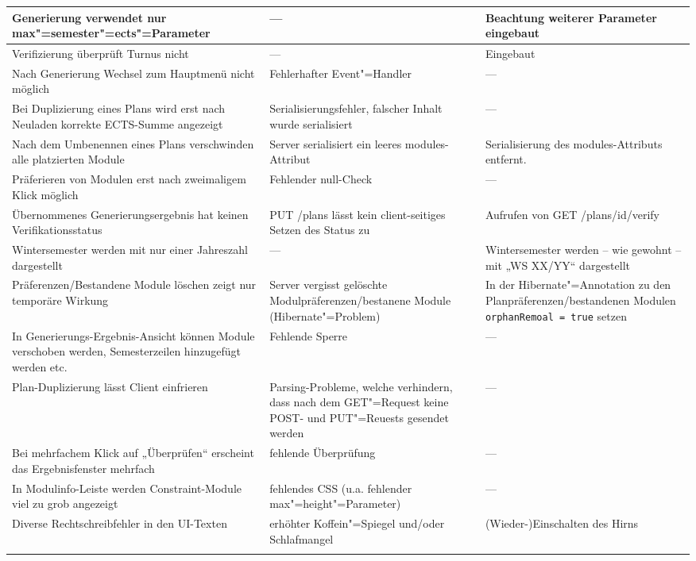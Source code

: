\begin{longtable}{| >{\hspace{0pt}} p{} | >{\hspace{0pt}} p{} | >{\hspace{0pt}} p{} | }
	\hline
	Generierung verwendet nur max"=semester"=ects"=Parameter & --- & Beachtung weiterer Parameter eingebaut \\
	\hline
	Verifizierung überprüft Turnus nicht & --- & Eingebaut \\
	\hline
	Nach Generierung Wechsel zum Hauptmenü nicht möglich & Fehlerhafter Event"=Handler & --- \\
	\hline
	Bei Duplizierung eines Plans wird erst nach Neuladen korrekte ECTS-Summe angezeigt & Serialisierungsfehler, falscher Inhalt wurde serialisiert & --- \\
	\hline
	Nach dem Umbenennen eines Plans verschwinden alle platzierten Module & Server serialisiert ein leeres modules-Attribut & Serialisierung des modules-Attributs entfernt. \\
	\hline
	Präferieren von Modulen erst nach zweimaligem Klick möglich & Fehlender null-Check & --- \\
	\hline
	Übernommenes Generierungsergebnis hat keinen Verifikationsstatus & PUT /plans lässt kein client-seitiges Setzen des Status zu & Aufrufen von GET /plans/id/verify \\
	\hline
	Wintersemester werden mit nur einer Jahreszahl dargestellt & --- & Wintersemester werden – wie gewohnt – mit „WS XX/YY“ dargestellt \\
	\hline
	Präferenzen/Bestandene Module löschen zeigt nur temporäre Wirkung & Server vergisst gelöschte Modulpräferenzen/bestanene Module (Hibernate"=Problem) & In der Hibernate"=Annotation zu den Planpräferenzen/bestandenen Modulen \texttt{orphanRemoal = true} setzen \\
	\hline
	In Generierungs-Ergebnis-Ansicht können Module verschoben werden, Semesterzeilen hinzugefügt werden etc. & Fehlende Sperre & --- \\
	\hline
	Plan-Duplizierung lässt Client einfrieren & Parsing-Probleme, welche verhindern, dass nach dem GET"=Request keine POST- und PUT"=Reuests gesendet werden & --- \\
	\hline
	Bei mehrfachem Klick auf „Überprüfen“ erscheint das Ergebnisfenster mehrfach & fehlende Überprüfung & --- \\
	\hline
	In Modulinfo-Leiste werden Constraint-Module viel zu grob angezeigt & fehlendes CSS (u.a. fehlender max"=height"=Parameter) & --- \\
	\hline
	Diverse Rechtschreibfehler in den UI-Texten & erhöhter Koffein"=Spiegel und/oder Schlafmangel & (Wieder-)Einschalten des Hirns \\
	\hhline{|=|=|=|}
\end{longtable}